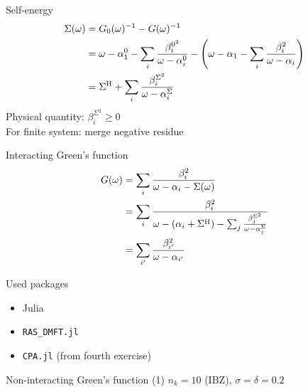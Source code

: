 \documentclass[aspectratio=169]{beamer}
\begin{document}
\begin{frame}{Self-energy}
    \begin{align}
        \Sigma(\omega) & = G_0(\omega)^{-1} - G(\omega)^{-1}                                       \\
                       & = \omega - \alpha^0_1 - \sum_i \frac{\beta_i^{0^2}}{\omega - \alpha_i^0}
        - \left(\omega - \alpha_1 - \sum_i \frac{\beta_i^2}{\omega - \alpha_i}\right)              \\
                       & = \Sigma^{\mathrm{H}} + \sum_i \frac{\beta_i^{\Sigma^2}}{\omega - \alpha_i^\Sigma}
    \end{align}
    Physical quantity: $\beta_i^{\Sigma^2} \ge 0$ \\
    For finite system: merge negative residue
\end{frame}

\begin{frame}{Interacting Green's function}
    \begin{align}
        G(\omega) & = \sum_i \frac{\beta_i^2}{\omega - \alpha_i - \Sigma(\omega)}                                                            \\
                  & = \sum_i \frac{\beta_i^2}{\omega - (\alpha_i + \Sigma^{\mathrm{H}}) - \sum_j \frac{\beta_j^{\Sigma^2}}{\omega - \alpha_j^\Sigma}} \\
                  & = \sum_{i'} \frac{\beta_{i'}^2}{\omega - \alpha_{i'}}
    \end{align}
\end{frame}

\begin{frame}{Used packages}
    \begin{itemize}
        \item Julia~
        \item \texttt{RAS\_DMFT.jl}~
        \item \texttt{CPA.jl} (from fourth exercise)
    \end{itemize}
\end{frame}

\begin{frame}{Non-interacting Green's function (1)}
    $n_k = 10$ (IBZ), $\sigma = \delta = 0.2$

    \begin{centering}
        
    \end{centering}
\end{frame}
\end{document}
